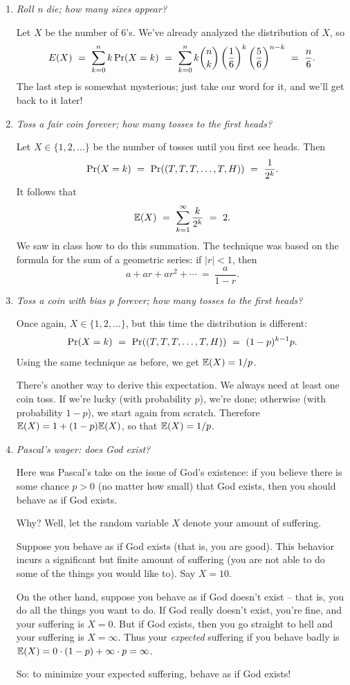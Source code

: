 \begin{enumerate}
\item {\it Roll n die; how many sixes appear?}

Let $X$ be the number of $6$'s. We've already analyzed the distribution of $X$, so
$$ E(X) 
\ = \ 
\sum_{k = 0}^n k \, \pr(X = k)
\ = \ 
\sum_{k = 0}^n k {n \choose k} \left(\frac{1}{6} \right)^k \left( \frac{5}{6} \right)^{n-k}
\ = \ 
\frac{n}{6}.
$$
The last step is somewhat mysterious; just take our word for it, and we'll get back to it later!

\item {\it Toss a fair coin forever; how many tosses to the first heads?}

Let $X \in \{1,2,\ldots\}$ be the number of tosses until you first see heads. Then
$$ \pr(X = k)
\ = \ 
\pr((T,T,T,\ldots,T,H))
\ = \ 
\frac{1}{2^k}.
$$
It follows that 
$$ \E(X) 
\ = \ 
\sum_{k=1}^\infty \frac{k}{2^k} 
\ = \ 
2.
$$
We saw in class how to do this summation. The technique was based on the formula for the
sum of a geometric series: if $|r| < 1$, then
$$ a + ar + ar^2 + \cdots \ = \ \frac{a}{1-r}.$$

\item {\it Toss a coin with bias $p$ forever; how many tosses to the first heads?}

Once again, $X \in \{1,2,\ldots\}$, but this time the distribution is different:
$$ \pr(X = k)
\ = \ 
\pr((T,T,T,\ldots,T,H))
\ = \ 
(1-p)^{k-1}p.
$$
Using the same technique as before, we get $\mathbb{E}(X) = 1/p$.

There's another way to derive this expectation. We always need at least one coin toss.
If we're lucky (with probability $p$), we're done; otherwise (with probability $1-p$),
we start again from scratch. Therefore $\mathbb{E}(X) = 1 + (1-p) \mathbb{E}(X)$, so that $\mathbb{E}(X) = 1/p$.

\item {\it Pascal's wager: does God exist?}

Here was Pascal's take on the issue of God's existence: if you believe there is
some chance $p > 0$ (no matter how small) that God exists, then you should behave
as if God exists.

Why? Well, let the random variable $X$ denote your amount of suffering.

Suppose you behave as if God exists (that is, you are good). This behavior incurs
a significant but finite amount of suffering (you are not able to do some of the
things you would like to). Say $X = 10$.

On the other hand, suppose you behave as if God doesn't exist -- that is, you 
do all the things you want to do. If God really doesn't exist, you're fine, and 
your suffering is $X = 0$. But if God exists, then you go straight to hell
and your suffering is $X = \infty$. Thus your {\it expected} suffering
if you behave badly is $\mathbb{E}(X) = 0 \cdot (1-p) + \infty \cdot p = \infty$.

So: to minimize your expected suffering, behave as if God exists!

\end{enumerate}

